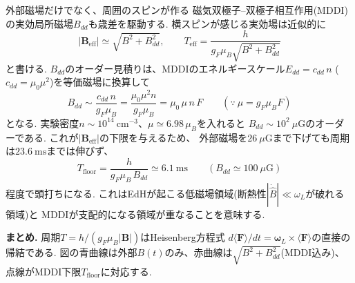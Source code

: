 \documentclass[11pt]{ltjsarticle}
\newcommand{\Fv}{\bm{F}}
\newcommand{\Bv}{\bm{B}}
\newcommand{\expv}[1]{\langle #1 \rangle}
\begin{document}
外部磁場だけでなく、周囲のスピンが作る
磁気双極子--双極子相互作用(MDDI)の実効局所磁場$B_{dd}$も歳差を駆動する.
横スピンが感じる実効場は近似的に
\begin{equation}
  |\Bv_{\mathrm{eff}}| \simeq \sqrt{B^2+B_{dd}^2},
  \qquad
  T_{\mathrm{eff}} = \frac{h}{g_F\mu_B\sqrt{B^2+B_{dd}^2}}
  \label{eq:eff}
\end{equation}
と書ける.
$B_{dd}$のオーダー見積りは、MDDIのエネルギースケール$E_{dd}=c_{dd}\,n$
($c_{dd}=\mu_0\mu^2$)を等価磁場に換算して
\begin{equation}
  B_{dd} \sim \frac{c_{dd}\,n}{g_F\mu_B}
  = \frac{\mu_0\mu^2 n}{g_F\mu_B}
  = \mu_0\,\mu\,n\,F
  \qquad(\because\ \mu=g_F\mu_B F)
\end{equation}
となる.
実験密度$n\sim10^{14}\ \mathrm{cm^{-3}}$、$\mu\simeq6.98\,\mu_B$を入れると
$B_{dd}\sim10^{2}\ \mu\mathrm{G}$のオーダーである.
これが$|\Bv_{\mathrm{eff}}|$の下限を与えるため、
外部磁場を$26\ \mu\mathrm{G}$まで下げても周期は$23.6\ \mathrm{ms}$までは伸びず、
\begin{equation}
  T_{\mathrm{floor}} = \frac{h}{g_F\mu_B\,B_{dd}}
  \simeq 6.1\ \mathrm{ms}\qquad(B_{dd}\simeq100\ \mu\mathrm{G})
\end{equation}
程度で頭打ちになる.
これはEdHが起こる低磁場領域(断熱性$|\dot{\hat{B}}|\ll\omega_L$が破れる領域)と
MDDIが支配的になる領域が重なることを意味する.

\bigskip
\noindent\textbf{まとめ.}\quad
周期$T=h/(g_F\mu_B|\Bv|)$はHeisenberg方程式
$d\expv{\Fv}/dt=\bm{\omega}_L\times\expv{\Fv}$の直接の帰結である.
図の青曲線は外部$B(t)$のみ、赤曲線は$\sqrt{B^2+B_{dd}^2}$(MDDI込み)、
点線がMDDI下限$T_{\mathrm{floor}}$に対応する.
\end{document}
